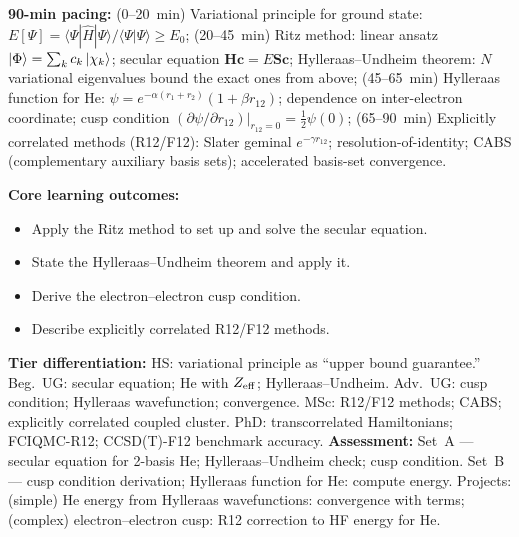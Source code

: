 \documentclass[11pt,a4paper]{article}
\begin{document}
\begin{tcolorbox}[chembox, title={Module~III.2 --- Lecture L07: Variational Methods}]
\textbf{90-min pacing:} (0--20~min) Variational principle for ground state: $E[\Psi]=\langle\Psi|\hat{H}|\Psi\rangle/\langle\Psi|\Psi\rangle\geq E_0$; (20--45~min) Ritz method: linear ansatz $\ket{\Phi}=\sum_k c_k\ket{\chi_k}$; secular equation $\mathbf{H}\mathbf{c}=E\mathbf{S}\mathbf{c}$; Hylleraas--Undheim theorem: $N$ variational eigenvalues bound the exact ones from above; (45--65~min) Hylleraas function for He: $\psi=e^{-\alpha(r_1+r_2)}(1+\beta r_{12})$; dependence on inter-electron coordinate; cusp condition $(\partial\psi/\partial r_{12})|_{r_{12}=0}=\tfrac{1}{2}\psi(0)$; (65--90~min) Explicitly correlated methods (R12/F12): Slater geminal $e^{-\gamma r_{12}}$; resolution-of-identity; CABS (complementary auxiliary basis sets); accelerated basis-set convergence.

\medskip\textbf{Core learning outcomes:}
\begin{itemize}[leftmargin=1.4em,topsep=2pt,itemsep=1pt]
  \item Apply the Ritz method to set up and solve the secular equation.
  \item State the Hylleraas--Undheim theorem and apply it.
  \item Derive the electron--electron cusp condition.
  \item Describe explicitly correlated R12/F12 methods.
\end{itemize}
\medskip\textbf{Tier differentiation:}
HS: variational principle as ``upper bound guarantee.''
Beg.\ UG: secular equation; He with $Z_{\rm eff}$; Hylleraas--Undheim.
Adv.\ UG: cusp condition; Hylleraas wavefunction; convergence.
MSc: R12/F12 methods; CABS; explicitly correlated coupled cluster.
PhD: transcorrelated Hamiltonians; FCIQMC-R12; CCSD(T)-F12 benchmark accuracy.
\medskip\textbf{Assessment:}
Set~A --- secular equation for 2-basis He; Hylleraas--Undheim check; cusp condition.
Set~B --- cusp condition derivation; Hylleraas function for He: compute energy.
Projects: (simple) He energy from Hylleraas wavefunctions: convergence with terms; (complex) electron--electron cusp: R12 correction to HF energy for He.
\end{tcolorbox}

\medskip
\end{document}
